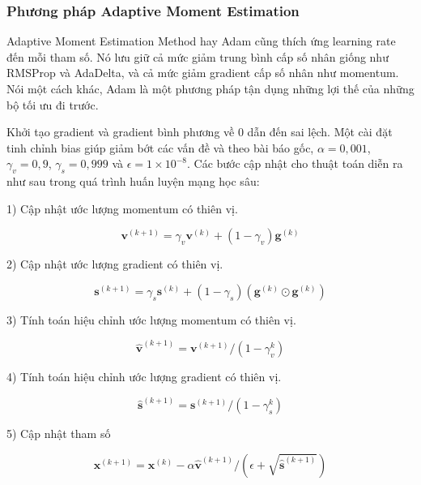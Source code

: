 \subsubsection{Phương pháp Adaptive Moment Estimation}

Adaptive Moment Estimation Method hay Adam cũng thích ứng learning rate đến mỗi tham số. Nó lưu giữ cả mức giảm trung bình cấp số nhân giống như RMSProp và AdaDelta, và cả mức giảm gradient cấp số nhân như momentum. Nói một cách khác, Adam là một phương pháp tận dụng những lợi thế của những bộ tối ưu đi trước.

Khởi tạo gradient và gradient bình phương về 0 dẫn đến sai lệch. Một cài đặt tinh chỉnh bias giúp giảm bớt các vấn đề và theo bài báo gốc, $\alpha = 0,001 $, $ \gamma_v = 0,9 $, $ \gamma_s = 0,999 $ và $ \epsilon = 1 \times 10 ^ {- 8} $. Các bước cập nhật cho thuật toán diễn ra như sau trong quá trình huấn luyện mạng học sâu:

1) Cập nhật ước lượng momentum có thiên vị.

\begin{equation}
    \mathbf{v}^{(k+1)} = \gamma_v\mathbf{v}^{(k)} + (1-\gamma_v)\mathbf{g}^{(k)}
\end{equation}

2) Cập nhật ước lượng gradient có thiên vị.

\begin{equation}
    \mathbf{s}^{(k+1)} = \gamma_s\mathbf{s}^{(k)} + (1-\gamma_s)\left(\mathbf{g}^{(k)} \odot \mathbf{g}^{(k)}\right)
\end{equation}

3) Tính toán hiệu chỉnh ước lượng momentum có thiên vị.

\begin{equation}
    \hat{\mathbf{v}}^{(k+1)} = \mathbf{v}^{(k+1)} / (1-\gamma_v^k)
\end{equation}

4) Tính toán hiệu chỉnh ước lượng gradient có thiên vị.

\begin{equation}
    \hat{\mathbf{s}}^{(k+1)} = \mathbf{s}^{(k+1)} / (1-\gamma_s^k)
\end{equation}

5) Cập nhật tham số

\begin{equation}
    \mathbf{x}^{(k+1)} = \mathbf{x}^{(k)} - \alpha\hat{\mathbf{v}}^{(k+1)} / \left(\epsilon + \sqrt{\hat{\mathbf{s}}^{(k+1)}}\right)
\end{equation}

